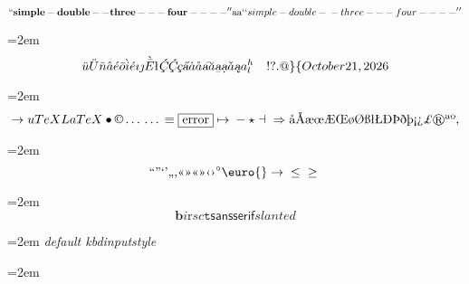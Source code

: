 \documentclass{book}
\begin{document}
\endgroup{}$$
\mathbf{``simple-double--three---four----''} \hbox{aa}
`\hbox{}`simple-double-\hbox{}-three---four----'\hbox{}'
$$
\par\begingroup\obeylines\obeyspaces\frenchspacing\leftskip=2em\relax\parskip=0pt\relax\ttfamily{}
\endgroup{}$$
\ddot{u} \ddot{U} \tilde{n} \hat{a} \acute{e} \bar{o} \grave{i} \acute{e} \imath{} \jmath{} \grave{\bar{E}}
\mathord{\text{\l{}}} \textsl{\c{\'{C}}} \textsl{\c{\'{C}}} \textsl{\c{c}} \textsl{\H{a}} \dot{a} \mathring{a} \textsl{\t{a}}
\breve{a} \textsl{\b{a}} \textsl{\d{a}} \check{a} \textsl{\k{a}} a^{h}_{l}
 \ {}\ {} \ {}\-{}   ! ? . @ \} \{ 
\today{}
$$
\par\begingroup\obeylines\obeyspaces\frenchspacing\leftskip=2em\relax\parskip=0pt\relax\ttfamily{}
\endgroup{}$$
\rightarrow{}
u
TeX LaTeX \bullet{} \copyright{} \dots{} \dots{} \equiv{}
\fbox{error} \mapsto{} - \star{} \dashv{} \Rightarrow{}
\mathord{\text{\aa{}}} \mathord{\text{\AA{}}} \mathord{\text{\ae{}}} \mathord{\text{\oe{}}} \mathord{\text{\AE{}}} \mathord{\text{\OE{}}} \mathord{\text{\o{}}} \mathord{\text{\O{}}} \mathord{\text{\ss{}}} \mathord{\text{\l{}}} \mathord{\text{\L{}}} \mathord{\text{\DH{}}}
\mathord{\text{\TH{}}} \mathord{\text{\dh{}}} \mathord{\text{\th{}}} \mathord{\text{\textexclamdown{}}} \mathord{\text{\textquestiondown{}}} \mathsterling{}
\circledR{} \mathord{\text{\textordfeminine{}}} \mathord{\text{\textordmasculine{}}} , 
$$
\par\begingroup\obeylines\obeyspaces\frenchspacing\leftskip=2em\relax\parskip=0pt\relax\ttfamily{}
\endgroup{}$$
\mathord{\text{\textquotedblleft{}}} \mathord{\text{\textquotedblright{}}} 
\mathord{\text{\textquoteleft{}}} \mathord{\text{\textquoteright{}}} \mathord{\text{\quotedblbase{}}} \mathord{\text{\quotesinglbase{}}} \mathord{\text{\guillemotleft{}}}
\mathord{\text{\guillemotright{}}} \mathord{\text{\guillemotleft{}}} \mathord{\text{\guillemotright{}}} \mathord{\text{\guilsinglleft{}}}
\mathord{\text{\guilsinglright{}}} ^{\circ{}} \euro{} \rightarrow{} \leq{} \geq{}
$$
\par\begingroup\obeylines\obeyspaces\frenchspacing\leftskip=2em\relax\parskip=0pt\relax\ttfamily{}
\endgroup{}$$
\mathbf{b} \mathit{i} \mathrm{r} sc \mathtt{t} \mathsf{sansserif} slanted
$$
\par\begingroup\obeylines\obeyspaces\frenchspacing\leftskip=2em\relax\parskip=0pt\relax\ttfamily{}
{\ttfamily\textsl{default kbdinputstyle}}
\par\begingroup\obeylines\obeyspaces\frenchspacing\leftskip=2em\relax\parskip=0pt\relax{}
\end{document}
